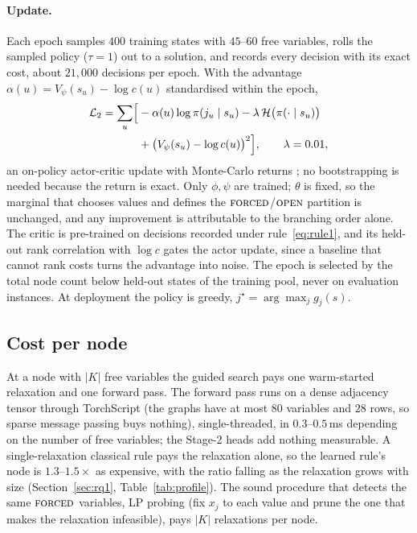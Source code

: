 \documentclass[final,5p,times,twocolumn,authoryear]{elsarticle}
\newcommand{\FORCED}{\textsc{forced}}
\newcommand{\FREE}{\textsc{open}}
\begin{document}
\paragraph{Update.} Each epoch samples $400$ training states with $45$--$60$ free variables, rolls the sampled policy ($\tau=1$) out to a solution, and records every decision with its exact cost, about $21{,}000$ decisions per epoch. With the advantage $\alpha(u)=V_\psi(s_u)-\log c(u)$ standardised within the epoch,
\begin{equation}
\begin{split}
\mathcal{L}_2=\sum_u\Bigl[&-\alpha(u)\log\pi(j_u\mid s_u)-\lambda\,\mathcal{H}\bigl(\pi(\cdot\mid s_u)\bigr)\\
&+\bigl(V_\psi(s_u)-\log c(u)\bigr)^2\Bigr],\qquad\lambda=0.01,
\end{split}
\label{eq:loss2}
\end{equation}
an on-policy actor-critic update with Monte-Carlo returns \citep{williams1992simple}; no bootstrapping is needed because the return is exact. Only $\phi,\psi$ are trained; $\theta$ is fixed, so the marginal that chooses values and defines the $\FORCED$/$\FREE$ partition is unchanged, and any improvement is attributable to the branching order alone. The critic is pre-trained on decisions recorded under rule~\eqref{eq:rule1}, and its held-out rank correlation with $\log c$ gates the actor update, since a baseline that cannot rank costs turns the advantage into noise. The epoch is selected by the total node count below held-out states of the training pool, never on evaluation instances. At deployment the policy is greedy, $j^\star=\arg\max_j g_j(s)$.

\subsection{Cost per node}
\label{sec:method-cost}

At a node with $|K|$ free variables the guided search pays one warm-started relaxation and one forward pass. The forward pass runs on a dense adjacency tensor through TorchScript (the graphs have at most $80$ variables and $28$ rows, so sparse message passing buys nothing), single-threaded, in $0.3$--$0.5$\,ms depending on the number of free variables; the Stage-2 heads add nothing measurable. A single-relaxation classical rule pays the relaxation alone, so the learned rule's node is $1.3$--$1.5\times$ as expensive, with the ratio falling as the relaxation grows with size (Section~\ref{sec:rq1}, Table~\ref{tab:profile}). The sound procedure that detects the same $\FORCED$ variables, LP probing (fix $x_j$ to each value and prune the one that makes the relaxation infeasible), pays $|K|$ relaxations per node.
\end{document}
